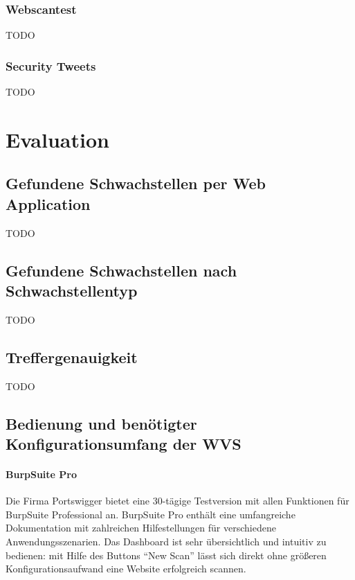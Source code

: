 \documentclass[12pt,oneside,a4paper,parskip]{scrbook}
\begin{document}
  \subsection{Webscantest}
  TODO
  \subsection{Security Tweets}
  TODO


\chapter{Evaluation}
  \section{Gefundene Schwachstellen per Web Application}
  TODO
  \section{Gefundene Schwachstellen nach Schwachstellentyp}
  TODO
  \section{Treffergenauigkeit}
  TODO
  \section{Bedienung und benötigter Konfigurationsumfang der WVS}
  \subsubsection{BurpSuite Pro}
  Die Firma Portswigger bietet eine 30-tägige Testversion mit allen Funktionen für BurpSuite Professional an. BurpSuite Pro enthält eine umfangreiche Dokumentation mit zahlreichen Hilfestellungen für verschiedene Anwendungsszenarien.  Das Dashboard ist sehr übersichtlich und intuitiv zu bedienen: mit Hilfe des Buttons ``New Scan'' lässt sich direkt ohne größeren Konfigurationsaufwand eine Website erfolgreich scannen.
\end{document}
